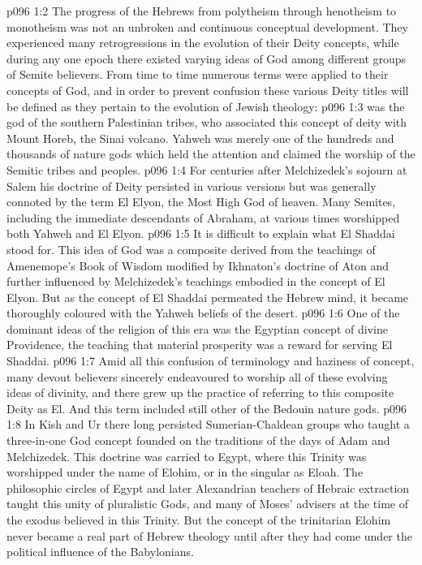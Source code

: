 \vs p096 1:2 The progress of the Hebrews from polytheism through henotheism to monotheism was not an unbroken and continuous conceptual development. They experienced many retrogressions in the evolution of their Deity concepts, while during any one epoch there existed varying ideas of God among different groups of Semite believers. From time to time numerous terms were applied to their concepts of God, and in order to prevent confusion these various Deity titles will be defined as they pertain to the evolution of Jewish theology:
\vs p096 1:3 \bibnobreakspace {} was the god of the southern Palestinian tribes, who associated this concept of deity with Mount Horeb, the Sinai volcano. Yahweh was merely one of the hundreds and thousands of nature gods which held the attention and claimed the worship of the Semitic tribes and peoples.
\vs p096 1:4 \bibnobreakspace {} For centuries after Melchizedek’s sojourn at Salem his doctrine of Deity persisted in various versions but was generally connoted by the term El Elyon, the Most High God of heaven. Many Semites, including the immediate descendants of Abraham, at various times worshipped both Yahweh and El Elyon.
\vs p096 1:5 \bibnobreakspace {} It is difficult to explain what El Shaddai stood for. This idea of God was a composite derived from the teachings of Amenemope’s Book of Wisdom modified by Ikhnaton’s doctrine of Aton and further influenced by Melchizedek’s teachings embodied in the concept of El Elyon. But as the concept of El Shaddai permeated the Hebrew mind, it became thoroughly coloured with the Yahweh beliefs of the desert.
\vs p096 1:6 One of the dominant ideas of the religion of this era was the Egyptian concept of divine Providence, the teaching that material prosperity was a reward for serving El Shaddai.
\vs p096 1:7 \bibnobreakspace {} Amid all this confusion of terminology and haziness of concept, many devout believers sincerely endeavoured to worship all of these evolving ideas of divinity, and there grew up the practice of referring to this composite Deity as El. And this term included still other of the Bedouin nature gods.
\vs p096 1:8 \bibnobreakspace {} In Kish and Ur there long persisted Sumerian\hyp{}Chaldean groups who taught a three\hyp{}in\hyp{}one God concept founded on the traditions of the days of Adam and Melchizedek. This doctrine was carried to Egypt, where this Trinity was worshipped under the name of Elohim, or in the singular as Eloah. The philosophic circles of Egypt and later Alexandrian teachers of Hebraic extraction taught this unity of pluralistic Gods, and many of Moses’ advisers at the time of the exodus believed in this Trinity. But the concept of the trinitarian Elohim never became a real part of Hebrew theology until after they had come under the political influence of the Babylonians.

